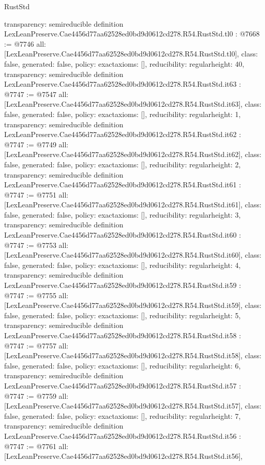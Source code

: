 \begin{lexlean}{RustStd}
\begin{coremodule}
{  transparency: semireducible
}
definition LexLeanPreserve.Cae4456d77aa62528ed0bd9d0612cd278.R54.RustStd.tl0 : @7668 := @7746 {
  all: [LexLeanPreserve.Cae4456d77aa62528ed0bd9d0612cd278.R54.RustStd.tl0],
  class: false,
  generated: false,
  policy: exact{axioms: []},
  reducibility: regular{height: 40},
  transparency: semireducible
}
definition LexLeanPreserve.Cae4456d77aa62528ed0bd9d0612cd278.R54.RustStd.it63 : @7747 := @7547 {
  all: [LexLeanPreserve.Cae4456d77aa62528ed0bd9d0612cd278.R54.RustStd.it63],
  class: false,
  generated: false,
  policy: exact{axioms: []},
  reducibility: regular{height: 1},
  transparency: semireducible
}
definition LexLeanPreserve.Cae4456d77aa62528ed0bd9d0612cd278.R54.RustStd.it62 : @7747 := @7749 {
  all: [LexLeanPreserve.Cae4456d77aa62528ed0bd9d0612cd278.R54.RustStd.it62],
  class: false,
  generated: false,
  policy: exact{axioms: []},
  reducibility: regular{height: 2},
  transparency: semireducible
}
definition LexLeanPreserve.Cae4456d77aa62528ed0bd9d0612cd278.R54.RustStd.it61 : @7747 := @7751 {
  all: [LexLeanPreserve.Cae4456d77aa62528ed0bd9d0612cd278.R54.RustStd.it61],
  class: false,
  generated: false,
  policy: exact{axioms: []},
  reducibility: regular{height: 3},
  transparency: semireducible
}
definition LexLeanPreserve.Cae4456d77aa62528ed0bd9d0612cd278.R54.RustStd.it60 : @7747 := @7753 {
  all: [LexLeanPreserve.Cae4456d77aa62528ed0bd9d0612cd278.R54.RustStd.it60],
  class: false,
  generated: false,
  policy: exact{axioms: []},
  reducibility: regular{height: 4},
  transparency: semireducible
}
definition LexLeanPreserve.Cae4456d77aa62528ed0bd9d0612cd278.R54.RustStd.it59 : @7747 := @7755 {
  all: [LexLeanPreserve.Cae4456d77aa62528ed0bd9d0612cd278.R54.RustStd.it59],
  class: false,
  generated: false,
  policy: exact{axioms: []},
  reducibility: regular{height: 5},
  transparency: semireducible
}
definition LexLeanPreserve.Cae4456d77aa62528ed0bd9d0612cd278.R54.RustStd.it58 : @7747 := @7757 {
  all: [LexLeanPreserve.Cae4456d77aa62528ed0bd9d0612cd278.R54.RustStd.it58],
  class: false,
  generated: false,
  policy: exact{axioms: []},
  reducibility: regular{height: 6},
  transparency: semireducible
}
definition LexLeanPreserve.Cae4456d77aa62528ed0bd9d0612cd278.R54.RustStd.it57 : @7747 := @7759 {
  all: [LexLeanPreserve.Cae4456d77aa62528ed0bd9d0612cd278.R54.RustStd.it57],
  class: false,
  generated: false,
  policy: exact{axioms: []},
  reducibility: regular{height: 7},
  transparency: semireducible
}
definition LexLeanPreserve.Cae4456d77aa62528ed0bd9d0612cd278.R54.RustStd.it56 : @7747 := @7761 {
  all: [LexLeanPreserve.Cae4456d77aa62528ed0bd9d0612cd278.R54.RustStd.it56],
}
\end{coremodule}
\end{lexlean}
